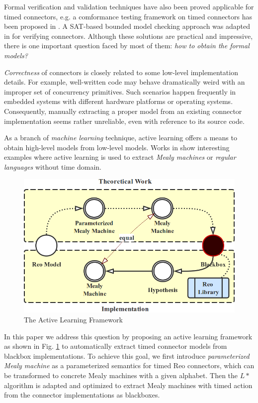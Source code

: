\documentclass[conference, a4paper]{IEEEtran}
\begin{document}
Formal verification and validation techniques have also been proved applicable for timed connectors, 
e.g. a comformance testing framework on timed connectors has been proposed in \cite{DBLP:conf/tase/LiCWS15}.
A SAT-based bounded model checking approach was adapted in \cite{DBLP:journals/scp/Kemper12} for
verifying connectors. Although these solutions are practical and impressive, there is one important
question faced by most of them: \emph{how to obtain the formal models?}

\emph{Correctness} of connectors is closely related to some low-level implementation details.
For example, well-written code may behave dramatically weird with an improper set of concurrency
primitives. Such scenarios happen frequently in embedded systems with different hardware platforms or
operating systems. Consequently, manually extracting a proper model from an existing connector
implementation seems rather unreliable, even with reference to its source code.

As a branch of \emph{machine learning} technique, active learning offers a means to obtain
high-level models from low-level models. Works in \cite{de2010grammatical,
DBLP:journals/iandc/Angluin87, DBLP:conf/fase/RaffeltS06} show interesting examples where active
learning is used to extract \emph{Mealy machines} or \emph{regular languages} without time domain.

\begin{figure}[ht]
  \begin{center}
    \includegraphics[width=.4\textwidth]{./images/howto.png}
  \end{center}
  \caption{The Active Learning Framework}
  \label{fig:howto}
\end{figure}

In this paper we address this question by proposing an active learning framework as shown in Fig.
\ref{fig:howto} to automatically extract timed connector models from blackbox implementations. 
To achieve this goal, we first introduce \emph{parameterized Mealy machine} as a parameterized
semantics for timed Reo connectors, which can be transformed to concrete Mealy machines with a
given alphabet. Then the $L*$ algorithm \cite{DBLP:journals/iandc/Angluin87} is adapted and
optimized to extract Mealy machines with timed action from the connector implementations as
blackboxes. 
\end{document}
